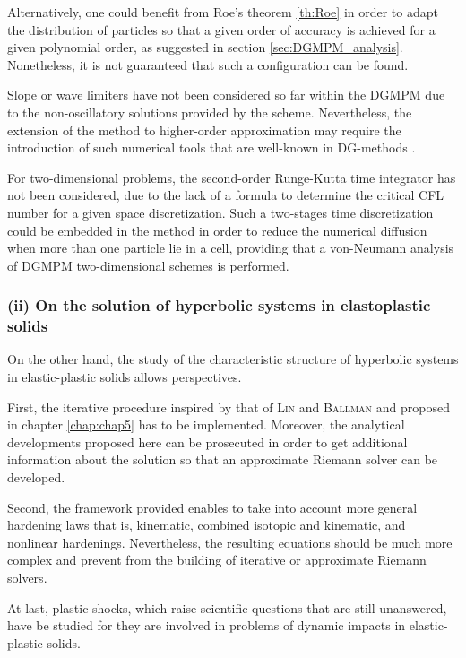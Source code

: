 Alternatively, one could benefit from Roe's theorem \ref{th:Roe} in order to adapt the distribution of particles so that a given order of accuracy is achieved for a given polynomial order, as suggested in section \ref{sec:DGMPM_analysis}.
Nonetheless, it is not guaranteed that such a configuration can be found.

Slope or wave limiters have not been considered so far within the DGMPM due to the non-oscillatory solutions provided by the scheme.
Nevertheless, the extension of the method to higher-order approximation may require the introduction of such numerical tools that are well-known in DG-methods \cite{Cockburn}.

For two-dimensional problems, the second-order Runge-Kutta time integrator has not been considered, due to the lack of a formula to determine the critical CFL number for a given space discretization.
Such a two-stages time discretization could be embedded in the method in order to reduce the numerical diffusion when more than one particle lie in a cell, providing that a von-Neumann analysis of DGMPM two-dimensional schemes is performed.


\subsubsection*{(ii) On the solution of hyperbolic systems in elastoplastic solids}
On the other hand, the study of the characteristic structure of hyperbolic systems in elastic-plastic solids allows perspectives.

First, the iterative procedure inspired by that of \textsc{Lin} and \textsc{Ballman} \cite{Lin_et_Ballman} and proposed in chapter \ref{chap:chap5} has to be implemented.
Moreover, the analytical developments proposed here can be prosecuted in order to get additional information about the solution so that an approximate Riemann solver can be developed.

Second, the framework provided enables to take into account more general hardening laws that is, kinematic, combined isotopic and kinematic, and nonlinear hardenings.
Nevertheless, the resulting equations should be much more complex and prevent from the building of iterative or approximate Riemann solvers.

At last, plastic shocks, which raise scientific questions that are still unanswered, have be studied for they are involved in problems of dynamic impacts in elastic-plastic solids.



